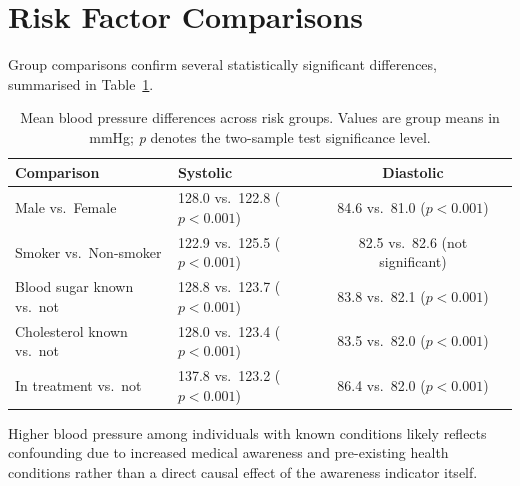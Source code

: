 \section{Risk Factor Comparisons}
\label{sec:eda_risk}

Group comparisons confirm several statistically significant differences, summarised in Table~\ref{tab:risk_factors}.

\begin{table}[h]
    \centering
    \caption{Mean blood pressure differences across risk groups. Values are group means in mmHg; \textit{p} denotes the two-sample test significance level.}
    \label{tab:risk_factors}
    \begin{tabular}{llcc}
        \toprule
        \textbf{Comparison} & \textbf{Systolic} & \textbf{Diastolic} \\
        \midrule
        Male vs.\ Female & 128.0 vs.\ 122.8 ($p<0.001$) & 84.6 vs.\ 81.0 ($p<0.001$) \\
        Smoker vs.\ Non-smoker & 122.9 vs.\ 125.5 ($p<0.001$) & 82.5 vs.\ 82.6 (not significant) \\
        Blood sugar known vs.\ not & 128.8 vs.\ 123.7 ($p<0.001$) & 83.8 vs.\ 82.1 ($p<0.001$) \\
        Cholesterol known vs.\ not & 128.0 vs.\ 123.4 ($p<0.001$) & 83.5 vs.\ 82.0 ($p<0.001$) \\
        In treatment vs.\ not & 137.8 vs.\ 123.2 ($p<0.001$) & 86.4 vs.\ 82.0 ($p<0.001$) \\
        \bottomrule
    \end{tabular}
\end{table}

Higher blood pressure among individuals with known conditions likely reflects confounding due to increased medical awareness and pre-existing health conditions rather than a direct causal effect of the awareness indicator itself.
